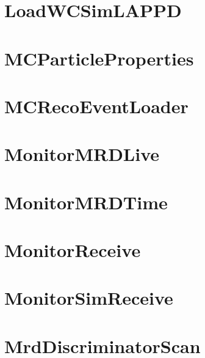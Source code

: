 \documentclass[twoside]{book}
\begin{document}
\chapter{Load\-W\-C\-Sim\-L\-A\-P\-P\-D}
\label{md_UserTools_LoadWCSimLAPPD_README}
\hypertarget{md_UserTools_LoadWCSimLAPPD_README}{}

\chapter{M\-C\-Particle\-Properties}
\label{md_UserTools_MCParticleProperties_README}
\hypertarget{md_UserTools_MCParticleProperties_README}{}

\chapter{M\-C\-Reco\-Event\-Loader}
\label{md_UserTools_MCRecoEventLoader_README}
\hypertarget{md_UserTools_MCRecoEventLoader_README}{}

\chapter{Monitor\-M\-R\-D\-Live}
\label{md_UserTools_MonitorMRDLive_README}
\hypertarget{md_UserTools_MonitorMRDLive_README}{}

\chapter{Monitor\-M\-R\-D\-Time}
\label{md_UserTools_MonitorMRDTime_README}
\hypertarget{md_UserTools_MonitorMRDTime_README}{}

\chapter{Monitor\-Receive}
\label{md_UserTools_MonitorReceive_README}
\hypertarget{md_UserTools_MonitorReceive_README}{}

\chapter{Monitor\-Sim\-Receive}
\label{md_UserTools_MonitorSimReceive_README}
\hypertarget{md_UserTools_MonitorSimReceive_README}{}

\chapter{Mrd\-Discriminator\-Scan}
\label{md_UserTools_MrdDiscriminatorScan_README}
\hypertarget{md_UserTools_MrdDiscriminatorScan_README}{}

\end{document}
